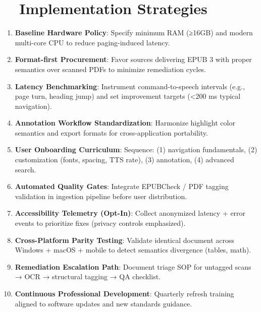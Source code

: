\section{~~Implementation Strategies}
\label{sec:sr27-implementation}
\begin{enumerate}
	\item \textbf{Baseline Hardware Policy}: Specify minimum RAM (≥16GB) and modern multi-core CPU to reduce paging-induced latency\supercite{ModernProcessorBenefits, SoftwareMemoryDemands, EducationalEquityReport2024}.
	\item \textbf{Format-first Procurement}: Favor sources delivering EPUB 3 with proper semantics over scanned PDFs to minimize remediation cycles.
	\item \textbf{Latency Benchmarking}: Instrument command-to-speech intervals (e.g., page turn, heading jump) and set improvement targets (<200 ms typical navigation).
	\item \textbf{Annotation Workflow Standardization}: Harmonize highlight color semantics and export formats for cross-application portability.
	\item \textbf{User Onboarding Curriculum}: Sequence: (1) navigation fundamentals, (2) customization (fonts, spacing, TTS rate), (3) annotation, (4) advanced search.
	\item \textbf{Automated Quality Gates}: Integrate EPUBCheck / PDF tagging validation in ingestion pipeline before user distribution.
	\item \textbf{Accessibility Telemetry (Opt-In)}: Collect anonymized latency + error events to prioritize fixes (privacy controls emphasized).
	\item \textbf{Cross-Platform Parity Testing}: Validate identical document across Windows + macOS + mobile to detect semantics divergence (tables, math).
	\item \textbf{Remediation Escalation Path}: Document triage SOP for untagged scans → OCR → structural tagging → QA checklist.
	\item \textbf{Continuous Professional Development}: Quarterly refresh training aligned to software updates and new standards guidance.
\end{enumerate}

